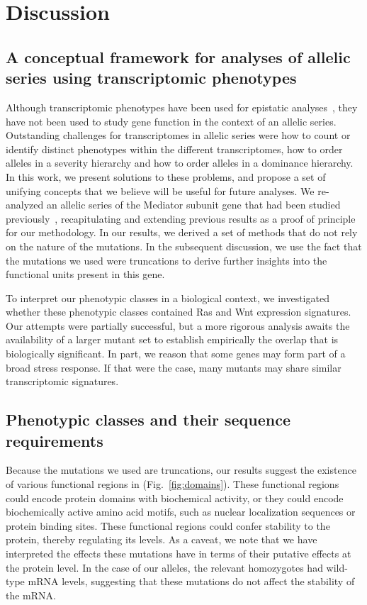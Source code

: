 \section*{Discussion}
\label{sec:conclusions}

\subsection{A conceptual framework for analyses of allelic series using
transcriptomic phenotypes}
Although transcriptomic phenotypes have been used for epistatic
analyses~\citep{Dixit2016,AngelesAlboresHIF,Angeles-Albores2017}, they have not
been used to study gene function in the context of an allelic series.
Outstanding challenges for transcriptomes in allelic series were how to count or
identify distinct phenotypes within the different transcriptomes, how to order
alleles in a severity hierarchy and how to order alleles in a dominance
hierarchy. In this work, we present solutions to these problems, and propose a
set of unifying concepts that we believe will be useful for future analyses. We
re-analyzed an allelic series of the Mediator subunit gene \dpy{} that had been
studied previously~\citep{Moghal2003}, recapitulating and extending previous
results as a proof of principle for our methodology. In our results, we derived
a set of methods that do not rely on the nature of the mutations. In the
subsequent discussion, we use the fact that the mutations we used were
truncations to derive further insights into the functional units present in this
gene.

To interpret our phenotypic classes in a biological context, we investigated
whether these phenotypic classes contained Ras and Wnt expression signatures.
Our attempts were partially successful, but a more rigorous analysis awaits the
availability of a larger mutant set to establish empirically the overlap that is
biologically significant. In part, we reason that some genes may form part of a
broad stress response. If that were the case, many mutants may share similar
transcriptomic signatures.

\subsection*{Phenotypic classes and their sequence requirements}
Because the mutations we used are truncations, our results suggest the existence
of various functional regions in  (Fig.~\ref{fig:domains}). These
functional regions could encode protein domains with biochemical activity, or
they could encode biochemically active amino acid motifs, such as nuclear
localization sequences or protein binding sites. These functional regions could
confer stability to the protein, thereby regulating its levels. As a caveat, we
note that we have interpreted the effects these mutations have in terms of their
putative effects at the protein level. In the case of our alleles, the relevant
homozygotes had wild-type \dpy{} mRNA levels, suggesting that these mutations
do not affect the stability of the mRNA.

